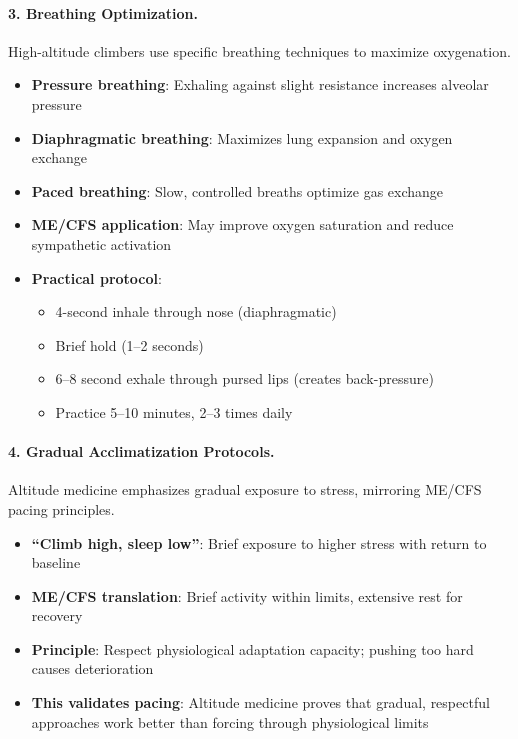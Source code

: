 \paragraph{3. Breathing Optimization.}
High-altitude climbers use specific breathing techniques to maximize oxygenation.

\begin{itemize}
    \item \textbf{Pressure breathing}: Exhaling against slight resistance increases alveolar pressure
    \item \textbf{Diaphragmatic breathing}: Maximizes lung expansion and oxygen exchange
    \item \textbf{Paced breathing}: Slow, controlled breaths optimize gas exchange
    \item \textbf{ME/CFS application}: May improve oxygen saturation and reduce sympathetic activation
    \item \textbf{Practical protocol}:
    \begin{itemize}
        \item 4-second inhale through nose (diaphragmatic)
        \item Brief hold (1--2 seconds)
        \item 6--8 second exhale through pursed lips (creates back-pressure)
        \item Practice 5--10 minutes, 2--3 times daily
    \end{itemize}
\end{itemize}

\paragraph{4. Gradual Acclimatization Protocols.}
Altitude medicine emphasizes gradual exposure to stress, mirroring ME/CFS pacing principles.

\begin{itemize}
    \item \textbf{``Climb high, sleep low''}: Brief exposure to higher stress with return to baseline
    \item \textbf{ME/CFS translation}: Brief activity within limits, extensive rest for recovery
    \item \textbf{Principle}: Respect physiological adaptation capacity; pushing too hard causes deterioration
    \item \textbf{This validates pacing}: Altitude medicine proves that gradual, respectful approaches work better than forcing through physiological limits
\end{itemize}

